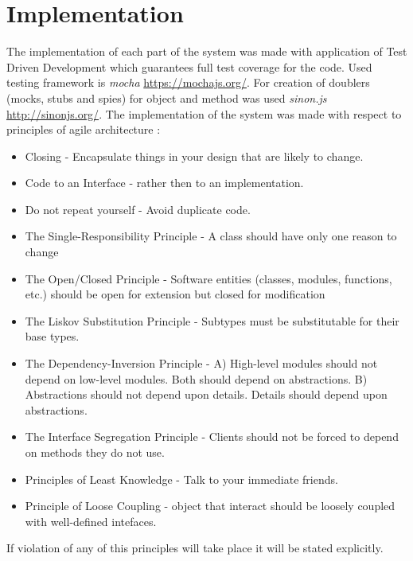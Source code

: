 \chapter{Implementation}
The implementation of each part of the system was made with application of Test Driven Development which guarantees full test coverage for the code. Used testing framework is \textit{mocha} \url{https://mochajs.org/}. For creation of doublers (mocks, stubs and spies) for object and method was used \textit{sinon.js }\url{http://sinonjs.org/}. 
The implementation of the system was made with respect to principles of agile architecture \cite{Dooley}\cite{MartinASD} :
\begin{itemize}
	\item Closing - Encapsulate things in your design that are likely to change.
	\item Code to an Interface - rather then to an implementation. 
	\item Do not repeat yourself - Avoid duplicate code.
	\item The Single-Responsibility Principle - A class should have only one reason to change
	\item The Open/Closed Principle - Software entities (classes, modules, functions, etc.) should be open for extension but closed for modification
	\item The Liskov Substitution Principle - Subtypes must be substitutable for their base types.
	\item The Dependency-Inversion Principle - A) High-level modules should not depend on low-level modules. 
	Both should depend on abstractions. 
	B) Abstractions should not depend upon details. 
	Details should depend upon abstractions.
	\item The Interface Segregation Principle - Clients should not be forced to depend on methods they do not use.
	\item Principles of Least Knowledge - Talk to your immediate friends. 
	\item Principle of Loose Coupling - object that interact should be loosely coupled with well-defined intefaces.
\end{itemize}
If violation of any of this principles will take place it will be stated explicitly.

